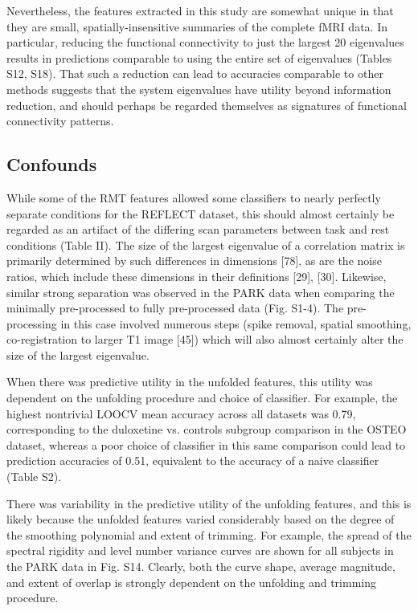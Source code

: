 Nevertheless, the features extracted in this study are somewhat unique in that they are small,
spatially-insensitive summaries of the complete fMRI data. In particular, reducing the functional
connectivity to just the largest 20 eigenvalues results in predictions comparable to using the
entire set of eigenvalues (Tables S12, S18). That such a reduction can lead to accuracies comparable
to other methods suggests that the system eigenvalues have utility beyond information reduction, and
should perhaps be regarded themselves as signatures of functional connectivity patterns.

\subsection{Confounds}
While some of the RMT features allowed some classifiers to nearly perfectly separate conditions for
the REFLECT dataset, this should almost certainly be regarded as an artifact of the differing scan
parameters between task and rest conditions (Table II). The size of the largest eigenvalue of a
correlation matrix is primarily determined by such differences in dimensions [78], as are the noise
ratios, which include these dimensions in their definitions [29], [30]. Likewise, similar strong
separation was observed in the PARK data when comparing the minimally pre-processed to fully
pre-processed data (Fig. S1-4). The pre-processing in this case involved numerous steps (spike
removal, spatial smoothing, co-registration to larger T1 image [45]) which will also almost
certainly alter the size of the largest eigenvalue.

When there was predictive utility in the unfolded features,	 this utility was dependent on the
unfolding procedure and choice of classifier. For example, the highest nontrivial LOOCV mean
accuracy across all datasets was 0.79, corresponding to the duloxetine vs. controls subgroup
comparison in the OSTEO dataset, whereas a poor choice of classifier in this same comparison could
lead to prediction accuracies of 0.51, equivalent to the accuracy of a naive classifier (Table S2).

There was variability in the predictive utility of the unfolding features, and this is likely
because the unfolded features varied considerably based on the degree of the smoothing polynomial
and extent of trimming. For example, the spread of the spectral rigidity and level number variance
curves are shown for all subjects in the PARK data in Fig. S14. Clearly, both the curve shape,
average magnitude, and extent of overlap is strongly dependent on the unfolding and trimming
procedure.

